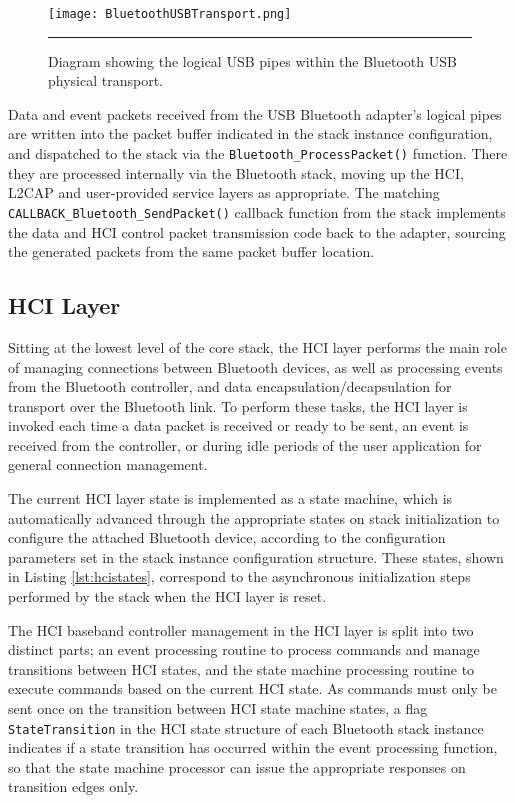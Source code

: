 \begin{figure}[tbph]
	\vspace{1em}
	\centering
		\texttt{[image: BluetoothUSBTransport.png]}
	\rule{35em}{0.5pt}
	\caption[Diagram of the logical pipes within the Bluetooth USB transport.]{Diagram showing the logical USB pipes within the Bluetooth USB physical transport.}
	\label{fig:btusbtransport}
\end{figure}

Data and event packets received from the USB Bluetooth adapter's logical pipes are written into the packet buffer indicated in the stack instance configuration, and dispatched to the stack via the \lstinline{Bluetooth_ProcessPacket()} function. There they are processed internally via the Bluetooth stack, moving up the HCI, L2CAP and user-provided service layers as appropriate. The matching \lstinline{CALLBACK_Bluetooth_SendPacket()} callback function from the stack implements the data and HCI control packet transmission code back to the adapter, sourcing the generated packets from the same packet buffer location.

\FloatBarrier
\subsection{HCI Layer}

Sitting at the lowest level of the core stack, the HCI layer performs the main role of managing connections between Bluetooth devices, as well as processing events from the Bluetooth controller, and data encapsulation/decapsulation for transport over the Bluetooth link. To perform these tasks, the HCI layer is invoked each time a data packet is received or ready to be sent, an event is received from the controller, or during idle periods of the user application for general connection management.

The current HCI layer state is implemented as a state machine, which is automatically advanced through the appropriate states on stack initialization to configure the attached Bluetooth device, according to the configuration parameters set in the stack instance configuration structure. These states, shown in Listing \ref{lst:hcistates}, correspond to the asynchronous initialization steps performed by the stack when the HCI layer is reset.



The HCI baseband controller management in the HCI layer is split into two distinct parts; an event processing routine to process commands and manage transitions between HCI states, and the state machine processing routine to execute commands based on the current HCI state. As commands must only be sent once on the transition between HCI state machine states, a flag \lstinline{StateTransition} in the HCI state structure of each Bluetooth stack instance indicates if a state transition has occurred within the event processing function, so that the state machine processor can issue the appropriate responses on transition edges only.

